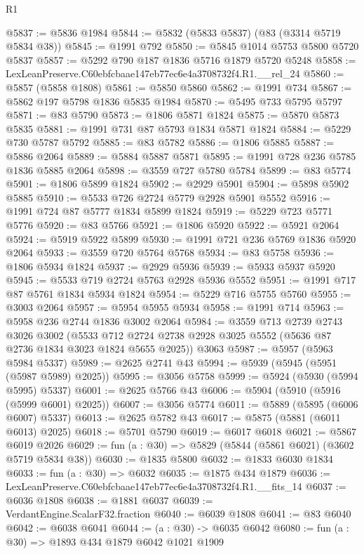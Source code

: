 \begin{lexlean}{R1}
\begin{coremodule}
@5837 := @5836 @1984
@5844 := @5832 (@5833 @5837) (@83 (@3314 @5719 @5834 @38))
@5845 := @1991 @792
@5850 := @5845 @1014 @5753 @5800 @5720 @5837
@5857 := @5292 @790 @187 @1836 @5716 @1879 @5720 @5248
@5858 := LexLeanPreserve.C60ebfcbaae147eb77ec6e4a3708732f4.R1.__rel_24
@5860 := @5857 (@5858 @1808)
@5861 := @5850 @5860
@5862 := @1991 @734
@5867 := @5862 @197 @5798 @1836 @5835 @1984
@5870 := @5495 @733 @5795 @5797
@5871 := @83 @5790
@5873 := @1806 @5871 @1824
@5875 := @5870 @5873 @5835
@5881 := @1991 @731 @87 @5793 @1834 @5871 @1824
@5884 := @5229 @730 @5787 @5792
@5885 := @83 @5782
@5886 := @1806 @5885
@5887 := @5886 @2064
@5889 := @5884 @5887 @5871
@5895 := @1991 @728 @236 @5785 @1836 @5885 @2064
@5898 := @3559 @727 @5780 @5784
@5899 := @83 @5774
@5901 := @1806 @5899 @1824
@5902 := @2929 @5901
@5904 := @5898 @5902 @5885
@5910 := @5533 @726 @2724 @5779 @2928 @5901 @5552
@5916 := @1991 @724 @87 @5777 @1834 @5899 @1824
@5919 := @5229 @723 @5771 @5776
@5920 := @83 @5766
@5921 := @1806 @5920
@5922 := @5921 @2064
@5924 := @5919 @5922 @5899
@5930 := @1991 @721 @236 @5769 @1836 @5920 @2064
@5933 := @3559 @720 @5764 @5768
@5934 := @83 @5758
@5936 := @1806 @5934 @1824
@5937 := @2929 @5936
@5939 := @5933 @5937 @5920
@5945 := @5533 @719 @2724 @5763 @2928 @5936 @5552
@5951 := @1991 @717 @87 @5761 @1834 @5934 @1824
@5954 := @5229 @716 @5755 @5760
@5955 := @3003 @2064
@5957 := @5954 @5955 @5934
@5958 := @1991 @714
@5963 := @5958 @236 @2744 @1836 @3002 @2064
@5984 := @3559
    @713
    @2739
    @2743
    @3026
    @3002
    (@5533 @712 @2724 @2738 @2928 @3025 @5552 (@5636 @87 @2736 @1834 @3023 @1824 @5655 @2025))
    @3063
@5987 := @5957 (@5963 @5984 @5337)
@5989 := @2625 @2741 @43
@5994 := @5939 (@5945 (@5951 (@5987 @5989) @2025))
@5995 := @3056 @5758
@5999 := @5924 (@5930 (@5994 @5995) @5337)
@6001 := @2625 @5766 @43
@6006 := @5904 (@5910 (@5916 (@5999 @6001) @2025))
@6007 := @3056 @5774
@6011 := @5889 (@5895 (@6006 @6007) @5337)
@6013 := @2625 @5782 @43
@6017 := @5875 (@5881 (@6011 @6013) @2025)
@6018 := @5701 @5790
@6019 := @6017 @6018
@6021 := @5867 @6019 @2026
@6029 := fun (a : @30) => @5829 (@5844 (@5861 @6021) (@3602 @5719 @5834 @38))
@6030 := @1835 @5800
@6032 := @1833 @6030 @1834
@6033 := fun (a : @30) => @6032
@6035 := @1875 @434 @1879
@6036 := LexLeanPreserve.C60ebfcbaae147eb77ec6e4a3708732f4.R1.__fits_14
@6037 := @6036 @1808
@6038 := @1881 @6037
@6039 := VerdantEngine.ScalarF32.fraction
@6040 := @6039 @1808
@6041 := @83 @6040
@6042 := @6038 @6041
@6044 := (a : @30) -> @6035 @6042
@6080 := fun (a : @30) =>
  @1893
    @434
    @1879
    @6042
    @1021
    @1909

\end{coremodule}
\end{lexlean}
